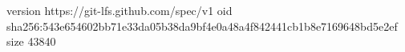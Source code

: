 version https://git-lfs.github.com/spec/v1
oid sha256:543e654602bb71e33da05b38da9bf4e0a48a4f842441cb1b8e7169648bd5e2ef
size 43840
